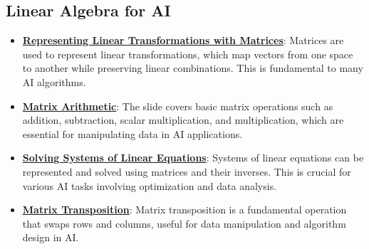 \documentclass{article}%
\begin{document}
\subsection{Linear Algebra for AI}%
\label{subsec:LinearAlgebraforAI}%
\begin{itemize}[leftmargin=*]%
\item \href{https://purdue.brightspace.com/d2l/common/assets/pdfjs-d2l-dist/1.0.14-legacy/web/viewer.html?file=\%2Fcontent\%2Fenforced\%2F1095467-wl.202510.CS.24300.001\%2F04L1-Linear Algebra Primer.pdf\%3Fou\%3D1095467\&lang=en-us\&container=d2l-fileviewer-rendered-pdf\&fullscreen=d2l-fileviewer-rendered-pdf-dialog\&height=667#page=5}{\textbf{Representing Linear Transformations with Matrices}}: Matrices are used to represent linear transformations, which map vectors from one space to another while preserving linear combinations. This is fundamental to many AI algorithms.%
\item \href{https://purdue.brightspace.com/d2l/common/assets/pdfjs-d2l-dist/1.0.14-legacy/web/viewer.html?file=\%2Fcontent\%2Fenforced\%2F1095467-wl.202510.CS.24300.001\%2F04L1-Linear Algebra Primer.pdf\%3Fou\%3D1095467\&lang=en-us\&container=d2l-fileviewer-rendered-pdf\&fullscreen=d2l-fileviewer-rendered-pdf-dialog\&height=667#page=9}{\textbf{Matrix Arithmetic}}: The slide covers basic matrix operations such as addition, subtraction, scalar multiplication, and multiplication, which are essential for manipulating data in AI applications.%
\item \href{https://purdue.brightspace.com/d2l/common/assets/pdfjs-d2l-dist/1.0.14-legacy/web/viewer.html?file=\%2Fcontent\%2Fenforced\%2F1095467-wl.202510.CS.24300.001\%2F04L1-Linear Algebra Primer.pdf\%3Fou\%3D1095467\&lang=en-us\&container=d2l-fileviewer-rendered-pdf\&fullscreen=d2l-fileviewer-rendered-pdf-dialog\&height=667#page=11}{\textbf{Solving Systems of Linear Equations}}: Systems of linear equations can be represented and solved using matrices and their inverses. This is crucial for various AI tasks involving optimization and data analysis.%
\item \href{https://purdue.brightspace.com/d2l/common/assets/pdfjs-d2l-dist/1.0.14-legacy/web/viewer.html?file=\%2Fcontent\%2Fenforced\%2F1095467-wl.202510.CS.24300.001\%2F04L1-Linear Algebra Primer.pdf\%3Fou\%3D1095467\&lang=en-us\&container=d2l-fileviewer-rendered-pdf\&fullscreen=d2l-fileviewer-rendered-pdf-dialog\&height=667#page=16}{\textbf{Matrix Transposition}}: Matrix transposition is a fundamental operation that swaps rows and columns, useful for data manipulation and algorithm design in AI.%

\end{itemize}
\end{document}
